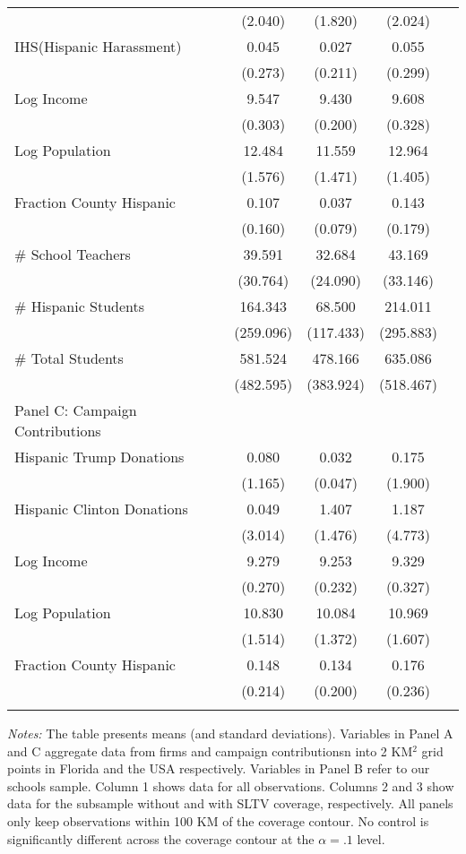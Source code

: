 \begin{table}[!h]
{\begin{threeparttable}
\begin{tabular}{l@{\extracolsep{4pt}}cccc}
				 & (2.040) & (1.820) & (2.024) \\
				 IHS(Hispanic Harassment) & 0.045 & 0.027 & 0.055 \\
				 & (0.273) & (0.211) & (0.299) \\
				 Log Income & 9.547 & 9.430 & 9.608 \\
				 & (0.303) & (0.200) & (0.328) \\
				 Log Population & 12.484 & 11.559 & 12.964 \\
				 & (1.576) & (1.471) & (1.405) \\
				 Fraction County Hispanic & 0.107 & 0.037 & 0.143 \\
				 & (0.160) & (0.079) & (0.179) \\
				 \# School Teachers & 39.591 & 32.684 & 43.169 \\
				 & (30.764) & (24.090) & (33.146)\\
				 \# Hispanic Students & 164.343 & 68.500  & 214.011 \\
				 & (259.096) & (117.433) & (295.883) \\
				 \# Total Students & 581.524 & 478.166 & 635.086 \\
				 & (482.595) & (383.924) & (518.467) \\
				\hline\addlinespace
				\hline\addlinespace
				Panel C: Campaign Contributions & \multicolumn{3}{c}{} \\
				\hline\addlinespace
				Hispanic Trump Donations & 0.080 & 0.032 & 0.175 \\
				& (1.165) & (0.047) & (1.900) \\
				Hispanic Clinton Donations & 0.049 & 1.407 & 1.187 \\
				& (3.014) & (1.476) & (4.773)\\
				Log Income & 9.279 & 9.253 & 9.329 \\
				& (0.270) & (0.232) & (0.327) \\
				Log Population & 10.830 & 10.084 & 10.969 \\
				& (1.514) & (1.372) & (1.607) \\
				Fraction County Hispanic & 0.148 & 0.134 & 0.176 \\
				& (0.214) & (0.200) & (0.236) \\
				\hline\addlinespace
				 \hline\addlinespace
			\end{tabular}
			\begin{tablenotes}[flushleft]
				\item \textit{Notes:} The table presents means (and standard deviations). Variables in Panel A and C aggregate data from firms and campaign contributionsn into 2 KM$^2$ grid points in Florida and the USA respectively. Variables in Panel B refer to our schools sample.  Column 1 shows data for all observations.  Columns 2 and 3 show data for the subsample without and with SLTV coverage, respectively. All panels only keep observations within 100 KM of the coverage contour. No control is significantly different across the coverage contour at the $\alpha = .1$ level.
			\end{tablenotes}
		\end{threeparttable}
	}
\end{table}
